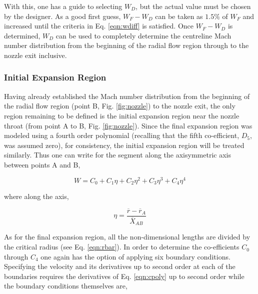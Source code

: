 	With this, one has a guide to selecting $W_D$, but the actual value must be chosen 
by the designer.  As a good first guess, $W_F - W_D$ can be taken as $1.5\%$ of $W_F$ and increased
until the criteria in Eq. \ref{eqn:wdiff} is satisfied.  Once $W_F - W_D$ is determined, $W_D$ can 
be used to completely determine the centreline Mach number distribution from the beginning 
of the radial flow region through to the nozzle exit inclusive.


\subsubsection{Initial Expansion Region}

	Having already established the Mach number distribution from the beginning of the
radial flow region (point B, Fig. \ref{fig:nozzle}) to the nozzle exit, the only region 
remaining to be defined is the initial expansion region near the nozzle throat (from
point A to B, Fig. \ref{fig:nozzle}).  Since the final expansion region was modeled using
a fourth order polynomial (recalling that the fifth co-efficient, $D_5$, was assumed zero),
for consistency, the initial expansion region will be treated similarly.  Thus one can write
for the segment along the axisymmetric axis between points A and B,

\begin{equation}
	W = C_0 + C_1\eta + C_2\eta^2 + C_3\eta^3 + C_4\eta^4
\label{eqn:cpoly}
\end{equation}

	where along the axis,

\begin{displaymath}
	\eta = \frac{\overline{r}-\overline{r}_A}{\overline{X}_{AB}}
\end{displaymath}

	As for the final expansion region, all the non-dimensional lengths are divided
by the critical radius (see Eq. \ref{eqn:rbar}).  In order to determine the 
co-efficients $C_0$ through $C_4$ one again has the option of applying six boundary conditions.  
Specifying the velocity and its derivatives up to second order at each of the boundaries
requires the derivatives of Eq. \ref{eqn:cpoly} up to second order while the boundary conditions
themselves are, 

